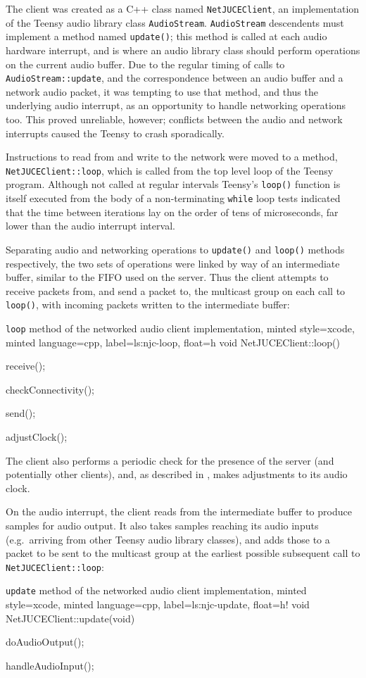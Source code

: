 The client was created as a C++ class named \texttt{NetJUCEClient}, an
implementation of the Teensy audio library class \texttt{AudioStream}.
\texttt{AudioStream} descendents must implement a method named
\texttt{update()}; this method is called at each audio hardware interrupt, and
is where an audio library class should perform operations on the current
audio buffer.
Due to the regular timing of calls to \texttt{AudioStream::update}, and the
correspondence between an audio buffer and a network audio packet, it was
tempting to use that method, and thus the underlying audio interrupt, as an
opportunity to handle networking operations too.
This proved unreliable, however; conflicts between the audio and network
interrupts caused the Teensy to crash sporadically.

Instructions to read from and write to the network were moved to a method,
\texttt{NetJUCEClient::loop}, which is called from the top level loop of
the Teensy program.
Although not called at regular intervals \textemdash{} Teensy's \texttt{loop()}
function is itself executed from the body of a non-terminating \texttt{while}
loop \textemdash{} tests indicated that the time between iterations lay on the
order of tens of microseconds, far lower than the audio interrupt interval.

Separating audio and networking operations to \texttt{update()} and
\texttt{loop()} methods respectively, the two sets of operations were linked
by way of an intermediate buffer, similar to the FIFO used on the server.
Thus the client attempts to receive packets from, and send a packet to, the
multicast group on each call to \texttt{loop()}, with incoming packets written
to the intermediate buffer:

\begin{codelisting}{
    \texttt{loop} method of the networked audio client implementation,
    minted style=xcode,
    minted language=cpp,
    label=ls:njc-loop,
    float=h
}
    void NetJUCEClient::loop() {
        receive();

        checkConnectivity();

        send();

        adjustClock();
    }
\end{codelisting}
\noindent
The client also performs a periodic check for the presence of the server (and
potentially other clients),
and, as described in , makes adjustments to its
audio clock.

On the audio interrupt, the client reads from the intermediate buffer to
produce samples for audio output.
It also takes samples reaching its audio inputs (e.g.\ arriving from other
Teensy audio library classes), and adds those to a packet to be sent to the
multicast group at the earliest possible subsequent call to
\texttt{NetJUCEClient::loop}:
\begin{codelisting}{
    \texttt{update} method of the networked audio client implementation,
    minted style=xcode,
    minted language=cpp,
    label=ls:njc-update,
    float=h!
}
    void NetJUCEClient::update(void) {
        doAudioOutput();

        handleAudioInput();
    }
\end{codelisting}

